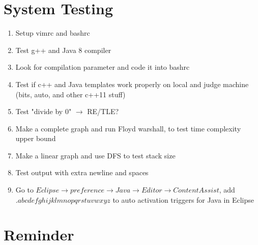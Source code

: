 \documentclass[10pt,oneside]{article}
\begin{document}
\begin{landscape}
\begin{multicols}{2}
			\section{System Testing}
			
			{\normalsize
				\begin{enumerate}
					\item Setup vimrc and bashrc
					\item Test g++ and Java 8 compiler
					\item Look for compilation parameter and code it into bashrc
					\item Test if c++ and Java templates work properly on local and judge machine (bits, auto, and other c++11 stuff)
					\item Test "divide by 0" $\rightarrow$ RE/TLE?
					\item Make a complete graph and run Floyd warshall, to test time complexity upper bound
					\item Make a linear graph and use DFS to test stack size
					\item Test output with extra newline and spaces
					\item Go to $Eclipse \rightarrow preference \rightarrow Java \rightarrow Editor \rightarrow Content Assist$, add $.abcdefghijklmnopqrstuvwxyz$ to auto activation triggers for Java in Eclipse
				\end{enumerate}
			}
			
			
			\section{Reminder}
			
			

\end{multicols}
\end{landscape}
\end{document}
